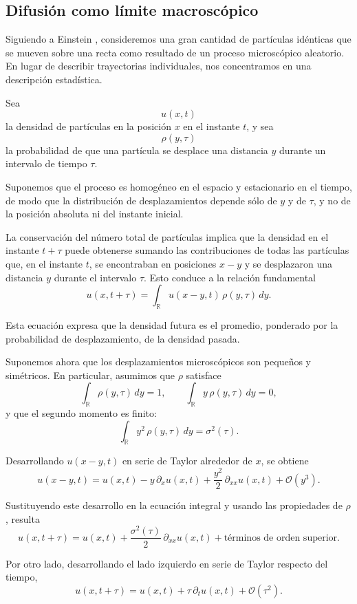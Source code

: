 \documentclass[12pt, a4paper]{amsbook}
\newcommand{\R}{{\mathbb R}}
\theoremstyle{remark}
\theoremstyle{definition}
\numberwithin{section}{chapter}
\numberwithin{subsection}{section}
\numberwithin{equation}{section}
\numberwithin{figure}{chapter}
\begin{document}
\subsection{Difusión como límite macroscópico}

Siguiendo a Einstein \cite{Einstein}, consideremos una gran cantidad de partículas idénticas que se mueven sobre una recta como resultado de un proceso microscópico aleatorio. En lugar de describir trayectorias individuales, nos concentramos en una descripción estadística.

Sea
$$
u(x, t)
$$
la densidad de partículas en la posición $x$ en el instante $t$, y sea
$$
\rho(y, \tau)
$$
la probabilidad de que una partícula se desplace una distancia $y$ durante un intervalo de tiempo $\tau$.

Suponemos que el proceso es homogéneo en el espacio y estacionario en el tiempo, de modo que la distribución de desplazamientos depende sólo de $y$ y de $\tau$, y no de la posición absoluta ni del instante inicial.

\medskip

La conservación del número total de partículas implica que la densidad en el instante $t+\tau$ puede obtenerse sumando las contribuciones de todas las partículas que, en el instante $t$, se encontraban en posiciones $x-y$ y se desplazaron una distancia $y$ durante el intervalo $\tau$. Esto conduce a la relación fundamental
$$
u(x,t+\tau) = \int_{\R} u(x-y, t)\,\rho(y, \tau)\,dy.
$$

Esta ecuación expresa que la densidad futura es el promedio, ponderado por la probabilidad de desplazamiento, de la densidad pasada.

\medskip

Suponemos ahora que los desplazamientos microscópicos son pequeños y simétricos. En particular, asumimos que $\rho$ satisface
$$
\int_\R \rho(y,\tau)\,dy = 1, \qquad \int_\R y\,\rho(y,\tau)\,dy = 0,
$$
y que el segundo momento es finito:
$$
\int_\R y^2\,\rho(y,\tau)\,dy = \sigma^2(\tau).
$$

Desarrollando $u(x-y,t)$ en serie de Taylor alrededor de $x$, se obtiene
$$
u(x-y,t) = u(x,t) - y\,\partial_x u(x,t) + \frac{y^2}{2}\,\partial_{xx} u(x,t) + \mathcal{O}(y^3).
$$

Sustituyendo este desarrollo en la ecuación integral y usando las propiedades de $\rho$, resulta
$$
u(x,t+\tau) = u(x,t) + \frac{\sigma^2(\tau)}{2}\,\partial_{xx} u(x,t) + \text{términos de orden superior}.
$$

Por otro lado, desarrollando el lado izquierdo en serie de Taylor respecto del tiempo,
$$
u(x,t+\tau) = u(x,t) + \tau\,\partial_t u(x,t) + \mathcal{O}(\tau^2).
$$
\end{document}
